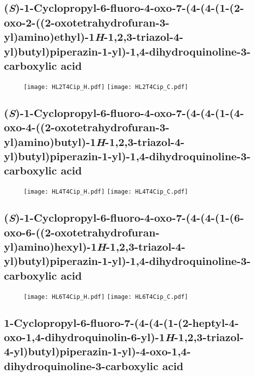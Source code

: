 \subsection{(\textit{S})-1-Cyclopropyl-6-fluoro-4-oxo-7-(4-(4-(1-(2-oxo-2-((2-oxotetrahydrofuran-3\allowbreak -yl)amino)ethyl)-1\textit{H}-1,2,3-triazol-4-yl)butyl)piperazin-1-yl)-1,4-dihydroquinol\allowbreak ine-3-carboxylic acid }

\begin{figure}[H]
	\centering
		\texttt{[image: HL2T4Cip\_H.pdf]}
		\texttt{[image: HL2T4Cip\_C.pdf]}
\end{figure}

\subsection{(\textit{S})-1-Cyclopropyl-6-fluoro-4-oxo-7-(4-(4-(1-(4-oxo-4-((2-oxotetrahydrofuran-3\allowbreak -yl)amino)butyl)-1\textit{H}-1,2,3-triazol-4-yl)butyl)piperazin-1-yl)-1,4-dihydroquinol\allowbreak ine-3-carboxylic acid }

\begin{figure}[H]
	\centering
		\texttt{[image: HL4T4Cip\_H.pdf]}
		\texttt{[image: HL4T4Cip\_C.pdf]}
\end{figure}

\subsection{(\textit{S})-1-Cyclopropyl-6-fluoro-4-oxo-7-(4-(4-(1-(6-oxo-6-((2-oxotetrahydrofuran-yl)amino)hexyl)-1\textit{H}-1,2,3-triazol-4-yl)butyl)piperazin-1-yl)-1,4-dihydroqui\allowbreak n\allowbreak oline-3-carboxylic acid }

\begin{figure}[H]
	\centering
		\texttt{[image: HL6T4Cip\_H.pdf]}
		\texttt{[image: HL6T4Cip\_C.pdf]}
\end{figure}

\subsection{1-Cyclopropyl-6-fluoro-7-(4-(4-(1-(2-heptyl-4-oxo-1,4-dihydroquinolin-6-yl)-1\allowbreak \textit{H}-1,2,3-triazol-4-yl)\allowbreak bu\allowbreak tyl)piperazin-1-yl)-4-oxo-1,4-dihydroqui\allowbreak n\allowbreak oline-3-carbo\allowbreak xylic acid }

